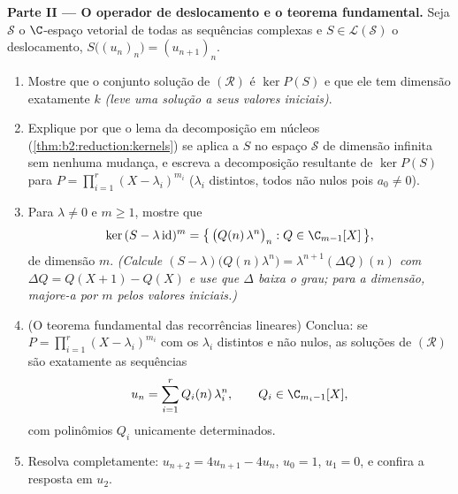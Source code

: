 \begin{problem}
\medskip
\noindent\textbf{Parte II --- O operador de deslocamento e o
teorema fundamental.} Seja $\mathcal{S}$ o $\C$-espaço vetorial
de todas as sequências complexas e $S \in
\mathcal{L}(\mathcal{S})$ o deslocamento, $S\bigl((u_n)_n\bigr) =
(u_{n+1})_n$.
\begin{enumerate}[resume]
  \item Mostre que o conjunto solução de $(\mathcal R)$ é $\ker
        P(S)$ e que ele tem dimensão exatamente $k$ \emph{(leve uma
        solução a seus valores iniciais)}.
  \item Explique por que o lema da decomposição em núcleos
        (\cref{thm:b2:reduction:kernels}) se aplica a $S$ no
        espaço $\mathcal{S}$ de dimensão infinita sem nenhuma mudança,
        e escreva a decomposição resultante de $\ker P(S)$ para
        $P = \prod_{i=1}^{r}(X - \lambda_i)^{m_i}$ ($\lambda_i$
        distintos, todos não nulos pois $a_0 \neq 0$).
  \item Para $\lambda \neq 0$ e $m \geq 1$, mostre que
        \[
        \ker\,(S - \lambda\,\mathrm{id})^m
        = \bigl\{\,\bigl(Q(n)\,\lambda^n\bigr)_n : Q \in
        \C_{m-1}[X]\,\bigr\},
        \]
        de dimensão $m$. \emph{(Calcule $(S -
        \lambda)\bigl(Q(n)\lambda^n\bigr) =
        \lambda^{n+1}(\Delta Q)(n)$ com $\Delta Q = Q(X + 1) -
        Q(X)$ e use que $\Delta$ baixa o grau; para a
        dimensão, majore-a por $m$ pelos valores iniciais.)}
  \item (O teorema fundamental das recorrências lineares) Conclua:
        se $P = \prod_{i=1}^{r}(X - \lambda_i)^{m_i}$ com os
        $\lambda_i$ distintos e não nulos, as soluções de
        $(\mathcal R)$ são exatamente as sequências
        \[
        u_n = \sum_{i=1}^{r} Q_i(n)\,\lambda_i^n,
        \qquad Q_i \in \C_{m_i - 1}[X],
        \]
        com polinômios $Q_i$ unicamente determinados.
  \item Resolva completamente: $u_{n+2} = 4u_{n+1} - 4u_n$, $u_0 =
        1$, $u_1 = 0$, e confira a resposta em $u_2$.
\end{enumerate}


\end{problem}
